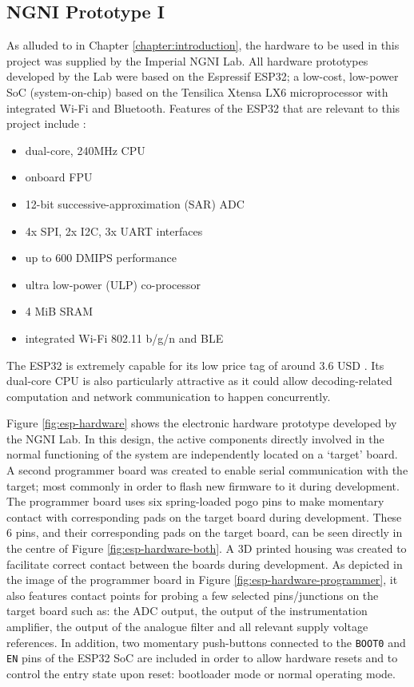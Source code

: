 \subsection{NGNI Prototype I}
\label{subsection:electronic-hardware-proto}
As alluded to in Chapter \ref{chapter:introduction}, the hardware to be used in this project was supplied by the Imperial NGNI Lab. All hardware prototypes developed by the Lab were based on the Espressif ESP32; a low-cost, low-power SoC (system-on-chip) based on the Tensilica Xtensa LX6 microprocessor with integrated Wi-Fi and Bluetooth. Features of the ESP32 that are relevant to this project include \cite{esp32-digikey}:
\begin{itemize}
    \item dual-core, 240MHz CPU
    \item onboard FPU
    \item 12-bit successive-approximation (SAR) ADC
    \item 4x SPI, 2x I2C, 3x UART interfaces
    \item up to 600 DMIPS performance
    \item ultra low-power (ULP) co-processor
    \item 4 MiB SRAM
    \item integrated Wi-Fi 802.11 b/g/n and BLE
\end{itemize}
The ESP32 is extremely capable for its low price tag of around 3.6 USD \cite{esp32-digikey}. Its dual-core CPU is also particularly attractive as it could allow decoding-related computation and network communication to happen concurrently.

Figure \ref{fig:esp-hardware} shows the electronic hardware prototype developed by the NGNI Lab. In this design, the active components directly involved in the normal functioning of the system are independently located on a `target' board. A second programmer board was created to enable serial communication with the target; most commonly in order to flash new firmware to it during development. The programmer board uses six spring-loaded pogo pins to make momentary contact with corresponding pads on the target board during development. These 6 pins, and their corresponding pads on the target board, can be seen directly in the centre of Figure \ref{fig:esp-hardware-both}. A 3D printed housing was created to facilitate correct contact between the boards during development. As depicted in the image of the programmer board in Figure \ref{fig:esp-hardware-programmer}, it also features contact points for probing a few selected pins/junctions on the target board such as: the ADC output, the output of the instrumentation amplifier, the output of the analogue filter and all relevant supply voltage references. In addition, two momentary push-buttons connected to the \texttt{BOOT0} and \texttt{EN} pins of the ESP32 SoC are included in order to allow hardware resets and to control the entry state upon reset: bootloader mode or normal operating mode. 

